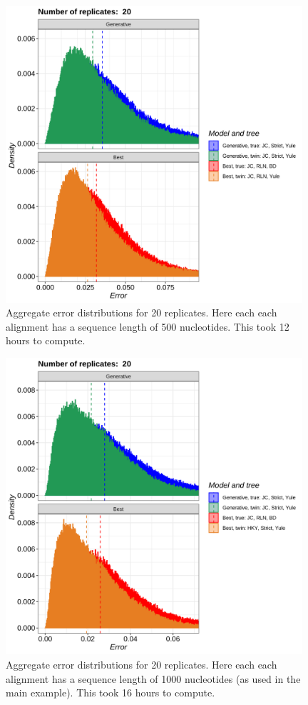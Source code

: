 \begin{figure}[H]
  \includegraphics[width=0.98\textwidth]{pirouette_example_19/errors.png}
  \caption{Aggregate error distributions for 20 replicates. Here each each alignment has a sequence length of 500 nucleotides. This took 12 hours to compute.}
  \label{fig:example_500_nucleotides}
\end{figure}

\begin{figure}[H]
  \includegraphics[width=0.98\textwidth]{pirouette_example_28/errors.png}
  \caption{Aggregate error distributions for 20 replicates. Here each each alignment has a sequence length of 1000 nucleotides (as used in the main example). This took 16 hours to compute.}
  \label{fig:example_1000_nucleotides}
\end{figure}

